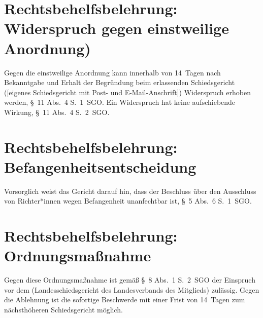 \section{Rechtsbehelfsbelehrung: Widerspruch gegen einstweilige Anordnung)}
\label{Vorlage:RMB_einstweilige}
Gegen die einstweilige Anordnung kann innerhalb von 14~Tagen nach Bekanntgabe und Erhalt der Begründung beim erlassenden Schiedsgericht ([eigenes Schiedsgericht mit Post- und E-Mail-Anschrift]) Widerspruch erhoben werden, \S~11 Abs.~4 S.~1~SGO.
Ein Widerspruch hat keine aufschiebende Wirkung, \S~11 Abs.~4 S.~2~SGO.

\section{Rechtsbehelfsbelehrung: Befangenheitsentscheidung}
\label{Vorlage:RMB_na}
Vorsorglich weist das Gericht darauf hin, dass der Beschluss über den Ausschluss von Richter*innen wegen Befangenheit unanfechtbar ist, \S~5 Abs.~6 S.~1~SGO.

\section{Rechtsbehelfsbelehrung: Ordnungsmaßnahme}
Gegen diese Ordnungsmaßnahme ist gemäß \S~8 Abs.~1 S.~2~SGO der Einspruch vor dem (Landesschiedsgericht des Landesverbands des Mitglieds) zulässig.
Gegen die Ablehnung ist die sofortige Beschwerde mit einer Frist von 14~Tagen zum nächsthöheren Schiedsgericht möglich.
